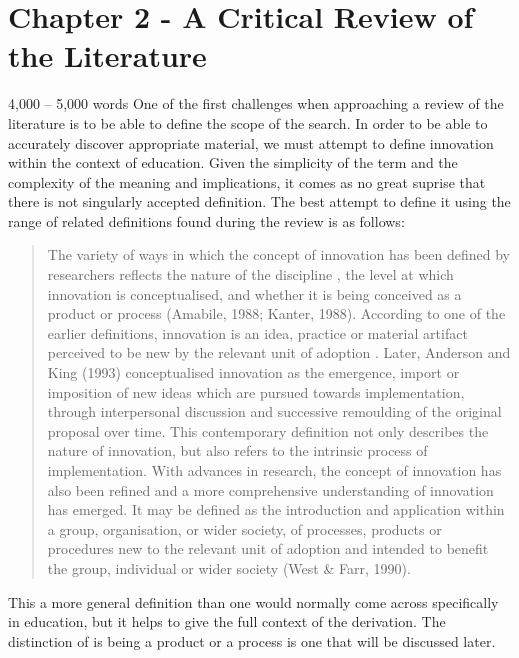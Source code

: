 \section{Chapter 2 - A Critical Review of the Literature}
4,000 – 5,000 words
One of the first challenges when approaching a review of the literature is to be able to define the scope of the search. In order to be able to accurately discover appropriate material, we must attempt to define innovation within the context of education. Given the simplicity of the term and the complexity of the meaning and implications, it comes as no great suprise that there is not singularly accepted definition. The best attempt to define it using the range of related definitions found during the review is as follows:

\begin{quote}
The variety of ways in which the concept of innovation has been defined by researchers reflects the nature of the discipline \cite{Gopalakrishnan_1994}, the level at which innovation is conceptualised, and whether it is being conceived as a product or process (Amabile, 1988; Kanter, 1988). According to one of the earlier definitions, innovation is an idea, practice or material artifact perceived to be new by the relevant unit of adoption \cite{Allen_1975}. Later, Anderson and King (1993) conceptualised innovation as the emergence, import or imposition of new ideas which are pursued towards implementation, through interpersonal discussion and successive remoulding of the original proposal over time. This contemporary definition not only describes the nature of innovation, but also refers to the intrinsic process of implementation. With advances in research, the concept of innovation has also been refined and a more comprehensive understanding of innovation has emerged. It may be defined as the introduction and application within a group, organisation, or wider society, of processes, products or procedures new to the relevant unit of adoption and intended to benefit the group, individual or wider society (West & Farr, 1990).
\end{quote}  \cite{Sharma_2005}

This a more general definition than one would normally come across specifically in education, but it helps to give the full context of the derivation. The distinction of is being a product or a process \cite{} is one that will be discussed later.

\cite{StopI4:online}